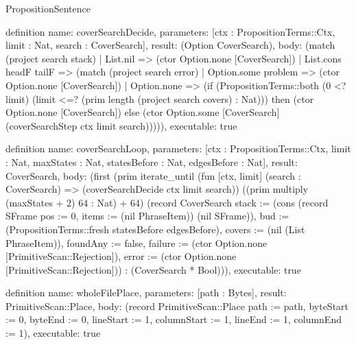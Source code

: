 \begin{lexlean}{PropositionSentence}
\begin{semanticmodule}
definition{
  name: coverSearchDecide,
  parameters: [ctx : PropositionTerms::Ctx, limit : Nat, search : CoverSearch],
  result: (Option CoverSearch),
  body: (match (project search stack)
    | List.nil => (ctor Option.none [CoverSearch])
    | List.cons headF tailF => (match (project search error)
      | Option.some problem => (ctor Option.none [CoverSearch])
      | Option.none => (if (PropositionTerms::both (0 <? limit) (limit <=? (prim length (project search covers) : Nat))) then (ctor Option.none [CoverSearch]) else (ctor Option.some [CoverSearch] (coverSearchStep ctx limit search))))),
  executable: true
}

definition{
  name: coverSearchLoop,
  parameters: [ctx : PropositionTerms::Ctx, limit : Nat, maxStates : Nat, statesBefore : Nat, edgesBefore : Nat],
  result: CoverSearch,
  body: (first (prim iterate_until (fun [ctx, limit] (search : CoverSearch) => (coverSearchDecide ctx limit search)) ((prim multiply (maxStates + 2) 64 : Nat) + 64) (record CoverSearch {stack := (cons (record SFrame {pos := 0, items := (nil PhraseItem)}) (nil SFrame)), bud := (PropositionTerms::fresh statesBefore edgesBefore), covers := (nil (List PhraseItem)), foundAny := false, failure := (ctor Option.none [PrimitiveScan::Rejection]), error := (ctor Option.none [PrimitiveScan::Rejection])}) : (CoverSearch * Bool))),
  executable: true
}

definition{
  name: wholeFilePlace,
  parameters: [path : Bytes],
  result: PrimitiveScan::Place,
  body: (record PrimitiveScan::Place {path := path, byteStart := 0, byteEnd := 0, lineStart := 1, columnStart := 1, lineEnd := 1, columnEnd := 1}),
  executable: true
}


\end{semanticmodule}
\end{lexlean}
